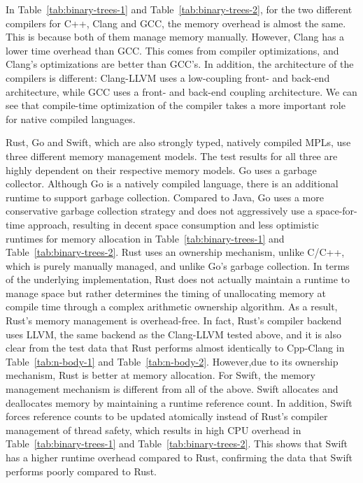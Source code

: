 In Table~\ref{tab:binary-trees-1} and Table~\ref{tab:binary-trees-2},
for the two different compilers for C++, Clang and GCC, the memory overhead is almost the same.
This is because both of them manage memory manually.
However, Clang has a lower time overhead than GCC. This comes from compiler optimizations,
and Clang's optimizations are better than GCC's. In addition, the architecture of the compilers is different:
Clang-LLVM uses a low-coupling front- and back-end architecture, while GCC uses a front- and back-end coupling
architecture.
We can see that compile-time optimization of the compiler takes a more important role for native compiled languages.

Rust, Go and Swift, which are also strongly typed, natively compiled MPLs,
use three different memory management models.
The test results for all three are highly dependent on their
respective memory models.
Go uses a garbage collector.
Although Go is a natively compiled language, there is an additional runtime to support garbage collection.
Compared to Java, Go uses a more conservative garbage collection strategy and does
not aggressively use a space-for-time approach, resulting in decent space consumption
and less optimistic runtimes for memory allocation in Table~\ref{tab:binary-trees-1} and Table~\ref{tab:binary-trees-2}.
Rust uses an ownership mechanism,
unlike C/C++, which is purely manually managed, and unlike Go's garbage collection.
In terms of the underlying implementation, Rust does not actually maintain a runtime
to manage space but rather determines the timing of unallocating memory at compile
time through a complex arithmetic ownership algorithm. As a result, Rust's memory
management is overhead-free. In fact, Rust's compiler backend uses LLVM, the same
backend as the Clang-LLVM tested above, and it is also clear from the test data that
Rust performs almost identically to Cpp-Clang in Table~\ref{tab:n-body-1} and Table~\ref{tab:n-body-2}.
However,due to its ownership mechanism, Rust is better at memory allocation. For Swift,
the memory management mechanism is different from all of the above. Swift allocates
and deallocates memory by maintaining a runtime reference count. In addition,
Swift forces reference counts to be updated atomically instead of Rust's compiler
management of thread safety, which results in high CPU overhead in Table~\ref{tab:binary-trees-1} and Table~\ref{tab:binary-trees-2}. This shows that
Swift has a higher runtime overhead compared to Rust, confirming the data that
Swift performs poorly compared to Rust.

